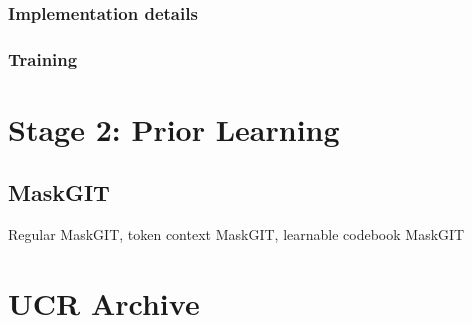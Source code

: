 \documentclass[../../thesis.tex]{subfiles}
\begin{document}
\subsubsection{Implementation details}

\subsubsection{Training}

\section{Stage 2: Prior Learning}

\subsection{MaskGIT}
Regular MaskGIT, token context MaskGIT, learnable codebook MaskGIT


\section{UCR Archive}
\end{document}
